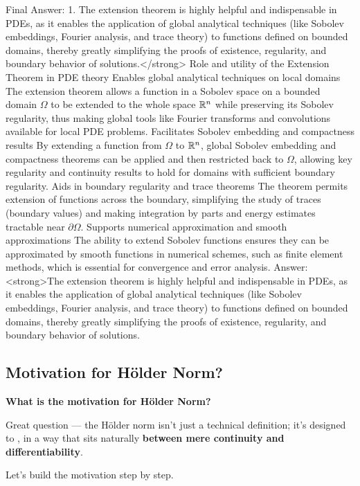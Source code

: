 \documentclass[12pt,a4paper]{report}
\begin{document}
\begin{description}
Final Answer:
1. The extension theorem is highly helpful and indispensable in PDEs, as it enables the application of global analytical techniques (like Sobolev embeddings, Fourier analysis, and trace theory) to functions defined on bounded domains, thereby greatly simplifying the proofs of existence, regularity, and boundary behavior of solutions.</strong>
Role and utility of the Extension Theorem in PDE theory
Enables global analytical techniques on local domains
The extension theorem allows a function in a Sobolev space on a bounded domain \(\Omega\) to be extended to the whole space \(\mathbb{R}^n\) while preserving its Sobolev regularity, thus making global tools like Fourier transforms and convolutions available for local PDE problems.
Facilitates Sobolev embedding and compactness results
By extending a function from \(\Omega\) to \(\mathbb{R}^n\), global Sobolev embedding and compactness theorems can be applied and then restricted back to \(\Omega\), allowing key regularity and continuity results to hold for domains with sufficient boundary regularity.
Aids in boundary regularity and trace theorems
The theorem permits extension of functions across the boundary, simplifying the study of traces (boundary values) and making integration by parts and energy estimates tractable near \(\partial\Omega\).
Supports numerical approximation and smooth approximations
The ability to extend Sobolev functions ensures they can be approximated by smooth functions in numerical schemes, such as finite element methods, which is essential for convergence and error analysis.
Answer: <strong>The extension theorem is highly helpful and indispensable in PDEs, as it enables the application of global analytical techniques (like Sobolev embeddings, Fourier analysis, and trace theory) to functions defined on bounded domains, thereby greatly simplifying the proofs of existence, regularity, and boundary behavior of solutions.

\newpage
\subsection*{Motivation for H\"older Norm?}
\item \textbf{What is the motivation for H\"older Norm?}

Great question — the Hölder norm isn’t just a technical definition; it’s designed to , in a way that sits naturally \textbf{between mere continuity and differentiability}.

Let’s build the motivation step by step.


\end{description}
\end{document}
